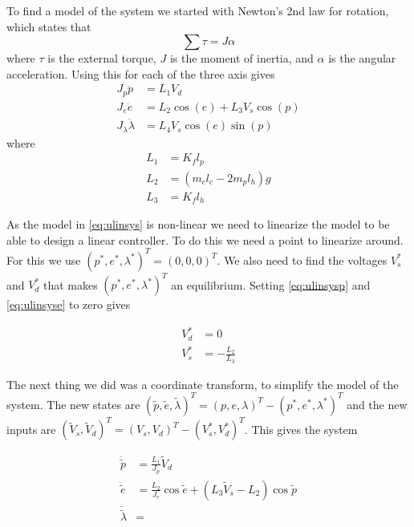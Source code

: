 To find a model of the system we started with Newton's 2nd law for rotation, which states that
\begin{equation} \label{eq:N2rot}
\sum \tau = J \alpha
\end{equation}
where $\tau$ is the external torque, $J$ is the moment of inertia, and $\alpha$ is the angular acceleration. Using this for each of the three axis gives
\begin{subequations}
  \begin{align}
    J_p\ddot{p} &= L_{1}V_{d} \label{eq:ulinsysp}\\
    J_e\ddot{e} &= L_{2} \cos(e) + L_3 V_s \cos(p) \label{eq:ulinsyse}\\
    J_\lambda \ddot{\lambda} &= L_4 V_s \cos(e) \sin(p) \label{eq:ulinsysl}
  \end{align}
  \label{eq:ulinsys}
\end{subequations}
where 
\begin{subequations}
	\begin{align*}
		L_1 &= K_f l_p\\
		L_2 &= (m_c l_c - 2 m_p l_h)g\\
		L_3 &= K_f l_h
	\end{align*}
\end{subequations}

As the model in \cref{eq:ulinsys} is non-linear we need to linearize the model to be able to design a linear controller. To do this we need a point to linearize around. For this we use $(p^*, e^*, \lambda^*)^T = (0, 0, 0)^T$. We also need to find the voltages $V_s^*$ and $V_d^*$ that makes $(p^*, e^*, \lambda^*)^T$ an equilibrium. Setting \cref{eq:ulinsysp} and \cref{eq:ulinsyse} to zero gives

\begin{subequations}
	\begin{align*}
		V_d^* &= 0\\
		V_s^* &= -\frac{L_2}{L_3}
	\end{align*}
\end{subequations}

The next thing we did was a coordinate transform, to simplify the model of the system. The new states are $ (\tilde p, \tilde e, \tilde \lambda)^T = (p, e, \lambda)^T - (p^*, e^*, \lambda^*)^T $ and the new inputs are $(\tilde V_s, \tilde V_d)^T = (V_s, V_d)^T - (V_s^*, V_d^*)^T $. This gives the system

\begin{subequations}
	\begin{align}
		\ddot{\tilde p} &= \frac{L_1}{J_p} \tilde V_d\\
		\ddot{\tilde e} &= \frac{L_2}{J_e} \cos \tilde e + (L_3 \tilde V_s - L_2) \cos \tilde p\\
		\ddot{\tilde \lambda} &= %
	\end{align}
	\label{eq:transformertulinsys}
\end{subequations}

